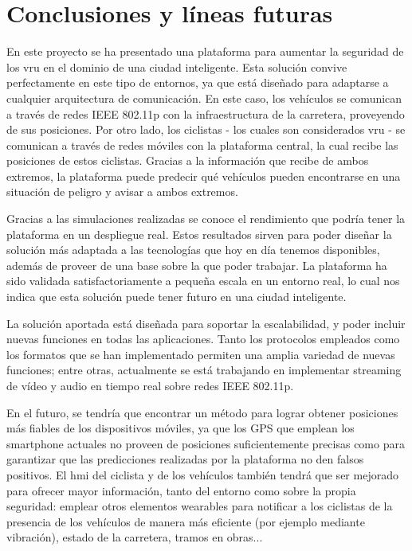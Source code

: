\chapter{Conclusiones y líneas futuras}
En este proyecto se ha presentado una plataforma para aumentar la seguridad de los \gls{vru} en el dominio de una ciudad inteligente. Esta solución convive perfectamente en este tipo de entornos, ya que está diseñado para adaptarse a cualquier arquitectura de comunicación. En este caso, los vehículos se comunican a través de redes IEEE 802.11p con la infraestructura de la carretera, proveyendo de sus posiciones. Por otro lado, los ciclistas - los cuales son considerados \gls{vru} - se comunican a través de redes móviles con la plataforma central, la cual recibe las posiciones de estos ciclistas. Gracias a la información que recibe de ambos extremos, la plataforma puede predecir qué vehículos pueden encontrarse en una situación de peligro y avisar a ambos extremos.

Gracias a las simulaciones realizadas se conoce el rendimiento que podría tener la plataforma en un despliegue real. Estos resultados sirven para poder diseñar la solución más adaptada a las tecnologías que hoy en día tenemos disponibles, además de proveer de una base sobre la que poder trabajar. La plataforma ha sido validada satisfactoriamente a pequeña escala en un entorno real, lo cual nos indica que esta solución puede tener futuro en una ciudad inteligente.

La solución aportada está diseñada para soportar la escalabilidad, y poder incluir nuevas funciones en todas las aplicaciones. Tanto los protocolos empleados como los formatos que se han implementado permiten una amplia variedad de nuevas funciones; entre otras, actualmente se está trabajando en implementar streaming de vídeo y audio en tiempo real sobre redes IEEE 802.11p.

En el futuro, se tendría que encontrar un método para lograr obtener posiciones más fiables de los dispositivos móviles, ya que los GPS que emplean los smartphone actuales no proveen de posiciones suficientemente precisas como para garantizar que las predicciones realizadas por la plataforma no den falsos positivos. El \gls{hmi} del ciclista y de los vehículos también tendrá que ser mejorado para ofrecer mayor información, tanto del entorno como sobre la propia seguridad: emplear otros elementos wearables para notificar a los ciclistas de la presencia de los vehículos de manera más eficiente (por ejemplo mediante vibración), estado de la carretera, tramos en obras...